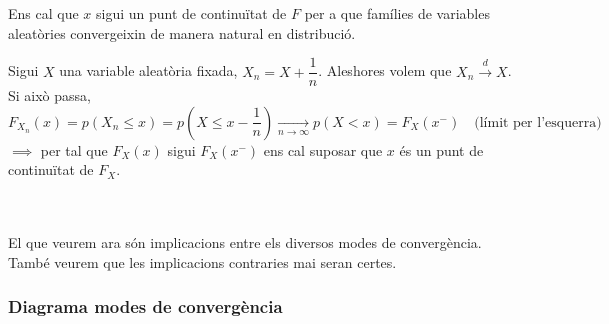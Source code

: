 \begin{obs}
  Ens cal que $x$ sigui un punt de continuïtat de $F$ per a que famílies de variables aleatòries convergeixin de manera natural en distribució.
\end{obs}

\newpage

\begin{example}
  Sigui $X$ una variable aleatòria fixada, $X_n = X + \dfrac{1}{n}$. Aleshores volem que $X_n \overset{d}{\longrightarrow} X$. Si això passa, 
  \[
    F_{X_n}(x) = p(X_n \leq x) = p(X \leq x -\frac{1}{n}) \underset{n\to \infty}{\longrightarrow}p(X<x) = F_X(x^-) \quad \text{(límit per l'esquerra)}
  \]
  $\implies$ per tal que $F_X(x)$ sigui $F_X(x^-)$ ens cal suposar que $x$ és un punt de continuïtat de $F_X$.
\end{example}
\-\\\\
El que veurem ara  són implicacions entre els diversos modes de convergència. \\
També veurem que les implicacions contraries mai seran certes.

\subsubsection{Diagrama modes de convergència}


